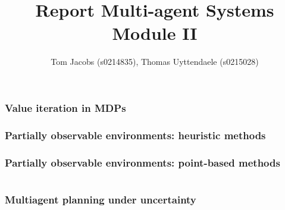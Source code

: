 \documentclass[10pt,a4paper]{article}
\title{Report Multi-agent Systems Module II}
\author{Tom Jacobs (s0214835), Thomas Uyttendaele (s0215028)}
\begin{document}
\maketitle
\part{}
\section{Value iteration in MDPs}


\section{Partially observable environments: heuristic methods}

\section{Partially observable environments: point-based methods}

\part{}
\section{Multiagent planning under uncertainty}
\end{document}
